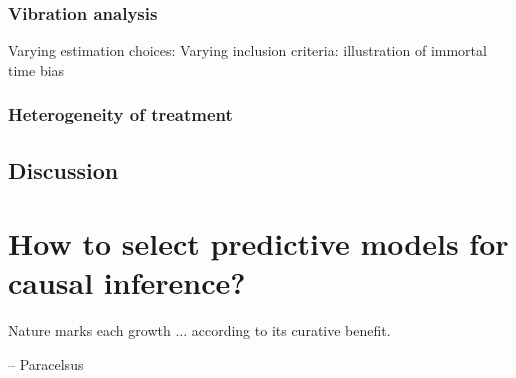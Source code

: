 \documentclass[french,12pt,twoside,a4paper]{book}
\newenvironment{citationbox}{
  \begin{tcolorbox}[
      enhanced,
      colback=gray!10, %
      colframe=white, %
      arc=0mm, %
      boxrule=0.5pt, %
      rightrule=0pt, %
      left=0pt, %
      right=0pt, %
      top=0pt, %
      bottom=0pt, %
      rightupper=0mm, %
      rightlower=0mm, %
      width=0.9\textwidth,
      flush right,
      ]
    \footnotesize %
    \itshape %
    }{
  \end{tcolorbox}%
}
\begin{document}
\subsection{Vibration analysis}\label{subsection:causal_tuto:vibration_mimic}
Varying estimation choices:
Varying inclusion criteria: illustration of immortal time bias

\subsection{Heterogeneity of treatment}\label{subsec:causal_tuto:heterogeneity_mimic}

\section{Discussion}\label{subsec:causal_tuto:discussion}

\chapter{How to select predictive models for causal inference?}\label{chapter:causal_model_selection}

\begin{citationbox}
  Nature marks each growth ... according to its curative benefit.
  \par\hfill -- Paracelsus
\end{citationbox}
\end{document}
